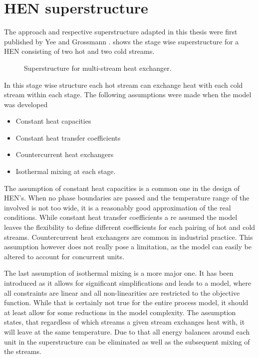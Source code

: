     \section{HEN superstructure}
        The approach and respective superstructure adapted in this thesis were first published by Yee and Grossmann
        \cite{Yee.1990}.  shows the stage wise superstructure for a HEN consisting of two hot
        and two cold streams.
    
        \begin{figure}
            
            \caption{Superstructure for multi-stream heat exchanger. \cite{Yee.1990}}
            \label{fig:HX_super}
        \end{figure}
    
        In this stage wise structure each hot stream can exchange heat with each cold stream within each stage.
        The following assumptions were made when the model was developed
        \begin{itemize}
            \item Constant heat capacities
            \item Constant heat transfer coefficients
            \item Countercurrent heat exchangers
            \item Isothermal mixing at each stage.
        \end{itemize}
    
        The assumption of constant heat capacities is a common one in the design of HEN's. When no phase boundaries are passed
        and the temperature range of the involved is not too wide, it is a reasonably good approximation of the real conditions.
        While constant heat transfer coefficients a re assumed the model leaves the flexibility to define different
        coefficients for each pairing of hot and cold streams. Countercurrent heat exchangers are common in industrial practice.
        This assumption however does not really pose a limitation, as the model can easily be altered to account for concurrent
        units.
    
        The last assumption of isothermal mixing is a more major one. It has been introduced as it allows for significant
        simplifications and leads to a model, where all constraints are linear and all non-linearities are restricted
        to the objective function. While that is certainly not true for the entire process model, it should at least
        allow for some reductions in the model complexity. The assumption states, that regardless of which streams a
        given stream exchanges heat with, it will leave at the same temperature. Due to that all energy balances around
        each unit in the superstructure can be eliminated as well as the subsequent mixing of the streams.
    

